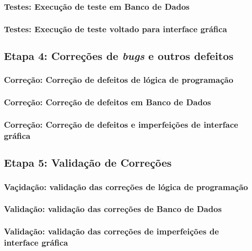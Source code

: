 \documentclass[12pt,a4paper]{article}
\begin{document}
		\subsubsection{Testes: Execução de teste em Banco de Dados}
		\subsubsection{Testes: Execução de teste voltado para interface gráfica}
		\subsection{Etapa 4: Correções de \textit{bugs} e outros defeitos}
		\subsubsection{Correção: Correção de defeitos de lógica de programação}
		\subsubsection{Correção: Correção de defeitos em Banco de Dados}
		\subsubsection{Correção: Correção de defeitos e imperfeições de interface gráfica}
		\subsection{Etapa 5: Validação de Correções}
		\subsubsection{Vaçidação: validação das correções de lógica de programação}
		\subsubsection{Validação: validação das correções de Banco de Dados}
		\subsubsection{Validação: validação das correções de imperfeições de interface gráfica}
		
\end{document}
